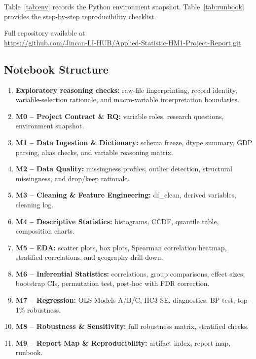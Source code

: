 \documentclass[a4paper,10pt]{article}
\begin{document}
Table~\ref{tab:env} records the Python environment snapshot. Table~\ref{tab:runbook} provides the step-by-step reproducibility checklist.

\begin{table}[H]
\centering
\caption{Environment snapshot: Python, pandas, numpy, matplotlib, seaborn versions for reproducibility.}
\label{tab:env}
\scriptsize
\resizebox{\textwidth}{!}{}
\end{table}

\begin{table}[H]
\centering
\caption{Runbook: step-by-step checklist for reproducing all report artifacts.}
\label{tab:runbook}
\small

\end{table}

Full repository available at: \\\url{https://github.com/Jincan-LI-HUB/Applied-Statistic-HM1-Project-Report.git}

\subsection{Notebook Structure}

\begin{enumerate}
  \item \textbf{Exploratory reasoning checks:} raw-file fingerprinting, record identity, variable-selection rationale, and macro-variable interpretation boundaries.
  \item \textbf{M0 -- Project Contract \& RQ:} variable roles, research questions, environment snapshot.
  \item \textbf{M1 -- Data Ingestion \& Dictionary:} schema freeze, dtype summary, GDP parsing, alias checks, and variable reasoning matrix.
  \item \textbf{M2 -- Data Quality:} missingness profiles, outlier detection, structural missingness, and drop/keep rationale.
  \item \textbf{M3 -- Cleaning \& Feature Engineering:} df\_clean, derived variables, cleaning log.
  \item \textbf{M4 -- Descriptive Statistics:} histograms, CCDF, quantile table, composition charts.
  \item \textbf{M5 -- EDA:} scatter plots, box plots, Spearman correlation heatmap, stratified correlations, and geography drill-down.
  \item \textbf{M6 -- Inferential Statistics:} correlations, group comparisons, effect sizes, bootstrap CIs, permutation test, post-hoc with FDR correction.
  \item \textbf{M7 -- Regression:} OLS Models A/B/C, HC3 SE, diagnostics, BP test, top-1\% robustness.
  \item \textbf{M8 -- Robustness \& Sensitivity:} full robustness matrix, stratified checks.
  \item \textbf{M9 -- Report Map \& Reproducibility:} artifact index, report map, runbook.
\end{enumerate}
\end{document}
